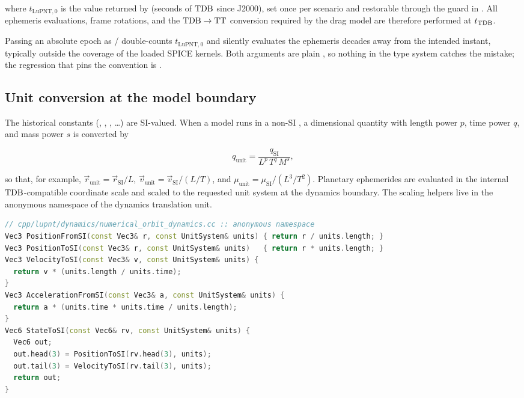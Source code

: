 where $t_{\mathrm{LuPNT},0}$ is the value returned by 
(seconds of $\mathrm{TDB}$ since J2000), set once per scenario and restorable through the
 guard in . All
ephemeris evaluations, frame rotations, and the $\mathrm{TDB}\rightarrow\mathrm{TT}$ conversion
required by the drag model are therefore performed at $t_{\mathrm{TDB}}$.

\begin{lupntwarning}
  Passing an absolute epoch as / double-counts
  $t_{\mathrm{LuPNT},0}$ and silently evaluates the ephemeris decades away from
  the intended instant, typically outside the coverage of the loaded SPICE
  kernels. Both arguments are plain , so nothing in the type system
  catches the mistake; the regression that pins the convention is
  .
\end{lupntwarning}

\subsection{Unit conversion at the model boundary}

The historical \lupnt{} constants (, ,
, \dots) are SI-valued. When a model runs in a non-SI
, a dimensional quantity with length power $p$, time power $q$,
and mass power $s$ is converted by

\begin{equation}
  \label{eq:dyn-units}
  q_\mathrm{unit} = \frac{q_\mathrm{SI}}{L^{p}\,T^{q}\,M^{s}},
\end{equation}

so that, for example,
$\vec{r}_\mathrm{unit} = \vec{r}_\mathrm{SI}/L$,
$\vec{v}_\mathrm{unit} = \vec{v}_\mathrm{SI}/(L/T)$, and
$\mu_\mathrm{unit} = \mu_\mathrm{SI}/(L^3/T^2)$. Planetary ephemerides are
evaluated in the internal $\mathrm{TDB}$-compatible coordinate scale and scaled to the
requested unit system at the dynamics boundary. The scaling helpers live in the
anonymous namespace of the dynamics translation unit.

\begin{lstlisting}[language=cpp, caption={Unit scaling at the dynamics boundary.}, label={lst:dyn-units}]
// cpp/lupnt/dynamics/numerical_orbit_dynamics.cc :: anonymous namespace
Vec3 PositionFromSI(const Vec3& r, const UnitSystem& units) { return r / units.length; }
Vec3 PositionToSI(const Vec3& r, const UnitSystem& units)   { return r * units.length; }
Vec3 VelocityToSI(const Vec3& v, const UnitSystem& units) {
  return v * (units.length / units.time);
}
Vec3 AccelerationFromSI(const Vec3& a, const UnitSystem& units) {
  return a * (units.time * units.time / units.length);
}
Vec6 StateToSI(const Vec6& rv, const UnitSystem& units) {
  Vec6 out;
  out.head(3) = PositionToSI(rv.head(3), units);
  out.tail(3) = VelocityToSI(rv.tail(3), units);
  return out;
}
\end{lstlisting}

